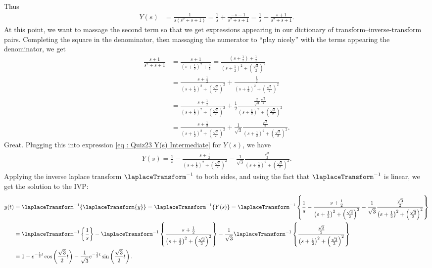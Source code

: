 {Thus
\begin{align}
Y(s)
&=
\frac{1}{s (s^{2} + s + 1)}
=
\frac{1}{s} + \frac{-s - 1}{s^{2} + s + 1}
=
\frac{1}{s} - \frac{s + 1}{s^{2} + s + 1}.%
\label{eq : Quiz23 Y(s) Intermediate}
\end{align}
At this point, we want to massage the second term so that we get expressions appearing in our dictionary of transform--inverse-transform pairs. Completing the square in the denominator, then massaging the numerator to ``play nicely'' with the terms appearing the denominator, we get
\begin{align*}
\frac{s + 1}{s^{2} + s + 1}
&=
\frac{s + 1}{\left(s + \frac{1}{2}\right)^{2} + \frac{3}{4}}
=
\frac{(s + \frac{1}{2}) + \frac{1}{2}}{\left(s + \frac{1}{2}\right)^{2} + \left(\frac{\sqrt{3}}{2}\right)^{2}}
\\
&=
\frac{s + \frac{1}{2}}{\left(s + \frac{1}{2}\right)^{2} + \left(\frac{\sqrt{3}}{2}\right)^{2}} + \frac{\frac{1}{2}}{(s + \frac{1}{2})^{2} + \left(\frac{\sqrt{3}}{2}\right)^{2}}
\\
&=
\frac{s + \frac{1}{2}}{\left(s + \frac{1}{2}\right)^{2} + \left(\frac{\sqrt{3}}{2}\right)^{2}} + \frac{1}{2} \frac{\frac{2}{\sqrt{3}} \frac{\sqrt{3}}{2}}{\left(s + \frac{1}{2}\right)^{2} + (\frac{\sqrt{3}}{2})^{2}}
\\
&=
\frac{s + \frac{1}{2}}{\left(s + \frac{1}{2}\right)^{2} + \left(\frac{\sqrt{3}}{2}\right)^{2}} + \frac{1}{\sqrt{3}} \frac{\frac{\sqrt{3}}{2}}{\left(s + \frac{1}{2}\right)^{2} + \left(\frac{\sqrt{3}}{2}\right)^{2}}.
\end{align*}
Great. Plugging this into expression \eqref{eq : Quiz23 Y(s) Intermediate} for $Y(s)$, we have
\begin{align*}
Y(s)
=
\frac{1}{s} - \frac{s + \frac{1}{2}}{\left(s + \frac{1}{2}\right)^{2} + \left(\frac{\sqrt{3}}{2}\right)^{2}} - \frac{1}{\sqrt{3}} \frac{\frac{\sqrt{3}}{2}}{\left(s + \frac{1}{2}\right)^{2} + \left(\frac{\sqrt{3}}{2}\right)^{2}}.
\end{align*}
Applying the inverse laplace transform $\laplaceTransform^{-1}$ to both sides, and using the fact that $\laplaceTransform^{-1}$ is linear, we get the solution to the IVP:
\begin{align}
y(t)
&=
\laplaceTransform^{-1}\{\laplaceTransform\{y\}\}
=
\laplaceTransform^{-1}\{Y(s)\}
=
\laplaceTransform^{-1}\left\{\frac{1}{s} - \frac{s + \frac{1}{2}}{\left(s + \frac{1}{2}\right)^{2} + \left(\frac{\sqrt{3}}{2}\right)^{2}} - \frac{1}{\sqrt{3}} \frac{\frac{\sqrt{3}}{2}}{\left(s + \frac{1}{2}\right)^{2} + \left(\frac{\sqrt{3}}{2}\right)^{2}}\right\}%
\nonumber
\\
&=
\laplaceTransform^{-1}\left\{\frac{1}{s}\right\} - \laplaceTransform^{-1}\left\{\frac{s + \frac{1}{2}}{\left(s + \frac{1}{2}\right)^{2} + \left(\frac{\sqrt{3}}{2}\right)^{2}}\right\} - \frac{1}{\sqrt{3}} \laplaceTransform^{-1}\left\{\frac{\frac{\sqrt{3}}{2}}{\left(s + \frac{1}{2}\right)^{2} + \left(\frac{\sqrt{3}}{2}\right)^{2}}\right\}%
\nonumber
\\
&=
1 - e^{-\frac{1}{2} t} \cos\left(\frac{\sqrt{3}}{2} t\right) - \frac{1}{\sqrt{3}} e^{-\frac{1}{2} t} \sin\left(\frac{\sqrt{3}}{2} t\right).%
\label{eq : Quiz23 Solution}
\end{align}

}
